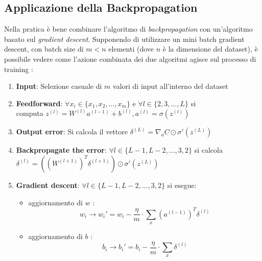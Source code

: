 \subsection{Applicazione della Backpropagation}

Nella pratica è bene combinare l’algoritmo di \textit{backpropagation} con un’algoritmo basato 
sul \textit{gradient descent}. Supponendo di utilizzare un mini batch gradient descent,
con batch size di $m < n$ elementi (dove $n$ è la dimensione del dataset), è possibile vedere come
l’azione combinata dei due algoritmi agisce sul processo di training 
\cite{GradientDescent_NeuralNetworks}:

\begin{enumerate}
    \item \textbf{Input}: Selezione casuale di $m$ valori di input all’interno del dataset
    \item \textbf{Feedforward}: $\forall x_i \in \{x_1, x_2, \dots, x_m\}$ e $\forall l \in
    \{2,3, \dots, L\}$ si \\ computa $z^{(l)} = W^{(l)}a^{(l-1)} +b^{(l)}, a^{(l)} = \sigma(z^{(l)})$
    
    \item \textbf{Output error}: Si calcola il vettore $\delta^{(L)} = \nabla_{a}C \odot \sigma '(z^{(L)})$ 
    \item \textbf{Backpropagate the error}: $\forall l \in \{L-1, L-2, \dots, 3, 2\}$ si calcola \\
    $\delta^{(l)} = ((W^{(l+1)})^{T} \delta^{(l+1)}) \odot \sigma '(z^{(L)})$

    \item \textbf{Gradient descent}: $\forall l \in \{L-1, L-2, \dots, 3, 2\}$ si esegue:
    \begin{itemize}
        \item aggiornamento di $w$ : 
        \begin{equation}
            w_i \to w_i' = w_i - \frac{\eta}{m} \cdot \sum_{x} (a^{(l-1)})^{T}\delta^{(l)} %
        \end{equation}
        \item aggiornamento di $b$ : 
        \begin{equation}
            b_i \to b_i' = b_i - \frac{\eta}{m} \cdot \sum_{x} \delta^{(l)} %
        \end{equation}
    \end{itemize}
\end{enumerate}


